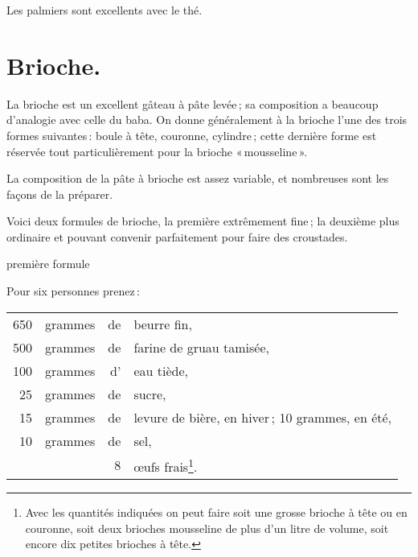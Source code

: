 Les palmiers sont excellents avec le thé.

\section*{\centering Brioche.}
{}

La brioche est un excellent gâteau à pâte levée ; sa composition a beaucoup
d'analogie avec celle du baba. On donne généralement à la brioche l'une des
trois formes suivantes : boule à tête, couronne, cylindre ; cette dernière
forme est réservée tout particulièrement pour la brioche « mousseline ».

La composition de la pâte à brioche est assez variable, et nombreuses sont les
façons de la préparer.

Voici deux formules de brioche, la première extrêmement fine ; la deuxième plus
ordinaire et pouvant convenir parfaitement pour faire des croustades.

\bigskip
\centering\sc
\footnotesize
première formule
\bigskip

\justifying
\normalfont
\normalsize

Pour six personnes prenez :

\footnotesize
\begin{longtable}{rrrp{16em}}
    650 & grammes & de & beurre fin,                                                                      \\
    500 & grammes & de & farine de gruau tamisée,                                                         \\
    100 & grammes & d' & eau tiède,                                                                       \\
     25 & grammes & de & sucre,                                                                           \\
     15 & grammes & de & levure de bière, en hiver ; 10 grammes, en été,                                  \\
     10 & grammes & de & sel,                                                                             \\
        &         &  8 & œufs frais\footnote{Avec les quantités indiquées
                         on peut faire soit une grosse brioche à tête ou en
                         couronne, soit deux brioches mousseline de plus d'un
                         litre de volume, soit encore dix petites brioches à tête.}.                      \\
\end{longtable}
\normalsize

